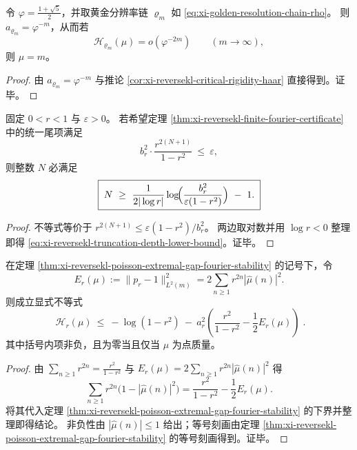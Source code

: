 \begin{corollary}[黄金分辨率链上的临界尺度]\label{cor:xi-golden-chain-reversekl-critical}
令 \(\varphi=\frac{1+\sqrt5}{2}\)，并取黄金分辨率链 \(\varrho_m\) 如 \eqref{eq:xi-golden-resolution-chain-rho}。
则 \(a_{\varrho_m}=\varphi^{-m}\)，从而若
\[
\mathcal H_{\varrho_m}(\mu)=o(\varphi^{-2m})\qquad(m\to\infty),
\]
则 \(\mu=m\)。
\end{corollary}
\begin{proof}
由 \(a_{\varrho_m}=\varphi^{-m}\) 与推论 \ref{cor:xi-reversekl-critical-rigidity-haar} 直接得到。证毕。
\end{proof}

\begin{proposition}[统一尾项预算的截断阶下界]\label{prop:xi-reversekl-truncation-depth-lower-bound}
固定 \(0<r<1\) 与 \(\varepsilon>0\)。
若希望定理 \ref{thm:xi-reversekl-finite-fourier-certificate} 中的统一尾项满足
\[
b_r^2\cdot \frac{r^{2(N+1)}}{1-r^2}\ \le\ \varepsilon,
\]
则整数 \(N\) 必满足
\begin{equation}\label{eq:xi-reversekl-truncation-depth-lower-bound}
\boxed{\;
N\ \ge\ \frac{1}{2|\log r|}\log\!\Bigl(\frac{b_r^2}{\varepsilon(1-r^2)}\Bigr)\ -\ 1.\;}
\end{equation}
\end{proposition}
\begin{proof}
不等式等价于 \(r^{2(N+1)}\le \varepsilon(1-r^2)/b_r^2\)。
两边取对数并用 \(\log r<0\) 整理即得 \eqref{eq:xi-reversekl-truncation-depth-lower-bound}。证毕。
\end{proof}



\begin{corollary}\label{cor:xi-reversekl-extremal-gap-energy-correction}
在定理 \ref{thm:xi-reversekl-poisson-extremal-gap-fourier-stability} 的记号下，令
\[
E_r(\mu):=\|p_r-1\|_{L^2(m)}^2=2\sum_{n\ge 1}r^{2n}|\widehat\mu(n)|^2.
\]
则成立显式不等式
\[
\boxed{\;
\mathcal H_r(\mu)\ \le\ -\log(1-r^2)\ -\ a_r^2\left(\frac{r^2}{1-r^2}-\frac12E_r(\mu)\right)\; }.
\]
其中括号内项非负，且为零当且仅当 \(\mu\) 为点质量。
\end{corollary}
\begin{proof}
由 \(\sum_{n\ge 1}r^{2n}=\frac{r^2}{1-r^2}\) 与 \(E_r(\mu)=2\sum_{n\ge 1}r^{2n}|\widehat\mu(n)|^2\) 得
\[
\sum_{n\ge 1}r^{2n}\bigl(1-|\widehat\mu(n)|^2\bigr)
=\frac{r^2}{1-r^2}-\frac12E_r(\mu).
\]
将其代入定理 \ref{thm:xi-reversekl-poisson-extremal-gap-fourier-stability} 的下界并整理即得结论。
非负性由 \(|\widehat\mu(n)|\le 1\) 给出；等号刻画由定理 \ref{thm:xi-reversekl-poisson-extremal-gap-fourier-stability} 的等号刻画得到。证毕。
\end{proof}

